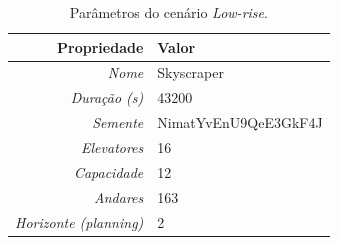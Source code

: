 \begin{table}[htb!]
\centering
\caption{Parâmetros do cenário \textit{Low-rise}.}
\label{tab:results:skyscraper:params}
\begin{tabular}{|r|l|}
\hline
\textbf{Propriedade}          & \textbf{Valor}       \\ \hline
\textit{Nome}                 & Skyscraper           \\ \hline
\textit{Duração (s)}          & 43200                \\ \hline
\textit{Semente}              & NimatYvEnU9QeE3GkF4J \\ \hline
\textit{Elevatores}           & 16                   \\ \hline
\textit{Capacidade}           & 12                   \\ \hline
\textit{Andares}              & 163                  \\ \hline
\textit{Horizonte (planning)} & 2                    \\ \hline
\end{tabular}
\end{table}

